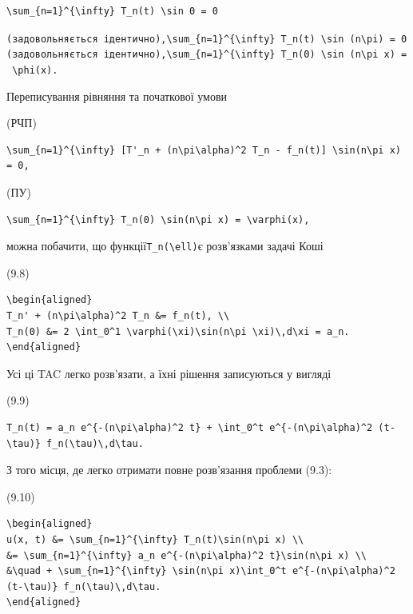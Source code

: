 \documentclass[
  ukrainian,
]{article}
\begin{document}
\begin{verbatim}
\sum_{n=1}^{\infty} T_n(t) \sin 0 = 0
\end{verbatim}

\texttt{(задовольняється\ ідентично),\textquotesingle{}\textbackslash{}sum\_\{n=1\}\^{}\{\textbackslash{}infty\}\ T\_n(t)\ \textbackslash{}sin\ (n\textbackslash{}pi)\ =\ 0\textquotesingle{}(задовольняється\ ідентично),\textquotesingle{}\textbackslash{}sum\_\{n=1\}\^{}\{\textbackslash{}infty\}\ T\_n(0)\ \textbackslash{}sin\ (n\textbackslash{}pi\ x)\ =\ \textbackslash{}phi(x)\textquotesingle{}.}

Переписування рівняння та початкової умови

(РЧП)

\begin{verbatim}
\sum_{n=1}^{\infty} [T'_n + (n\pi\alpha)^2 T_n - f_n(t)] \sin(n\pi x) = 0,
\end{verbatim}

(ПУ)

\begin{verbatim}
\sum_{n=1}^{\infty} T_n(0) \sin(n\pi x) = \varphi(x),
\end{verbatim}

можна побачити, що функції\texttt{T\_n(\textbackslash{}ell)}є
розв'язками задачі Коші

(9.8)

\begin{verbatim}
\begin{aligned}
T_n' + (n\pi\alpha)^2 T_n &= f_n(t), \\
T_n(0) &= 2 \int_0^1 \varphi(\xi)\sin(n\pi \xi)\,d\xi = a_n.
\end{aligned}
\end{verbatim}

Усі ці TAC легко розв'язати, а їхні рішення записуються у вигляді

(9.9)

\begin{verbatim}
T_n(t) = a_n e^{-(n\pi\alpha)^2 t} + \int_0^t e^{-(n\pi\alpha)^2 (t-\tau)} f_n(\tau)\,d\tau.
\end{verbatim}

З того місця, де легко отримати повне розв'язання проблеми (9.3):

(9.10)

\begin{verbatim}
\begin{aligned}
u(x, t) &= \sum_{n=1}^{\infty} T_n(t)\sin(n\pi x) \\
&= \sum_{n=1}^{\infty} a_n e^{-(n\pi\alpha)^2 t}\sin(n\pi x) \\
&\quad + \sum_{n=1}^{\infty} \sin(n\pi x)\int_0^t e^{-(n\pi\alpha)^2 (t-\tau)} f_n(\tau)\,d\tau.
\end{aligned}
\end{verbatim}
\end{document}
